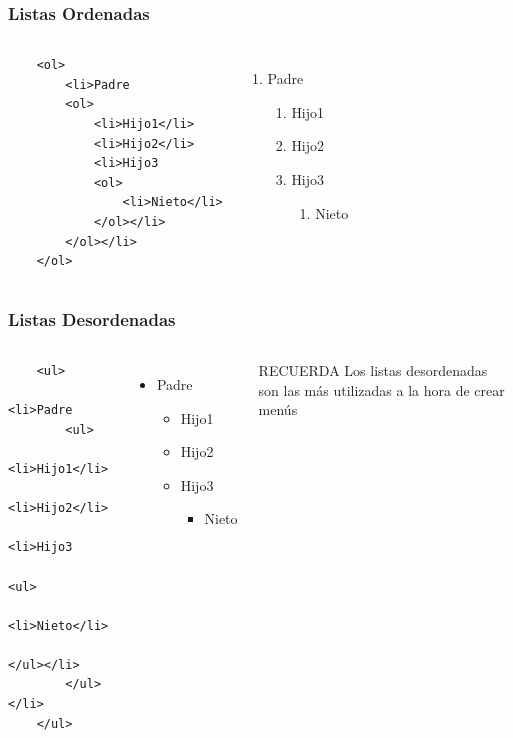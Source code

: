 \documentclass{beamer}
\begin{document}
\begin{frame}[fragile]
\frametitle{Listas Ordenadas}
	\begin{columns}[c]
	\begin{verbatim}
	<ol>
	    <li>Padre
	    <ol>
	        <li>Hijo1</li>
	        <li>Hijo2</li>
	        <li>Hijo3
	        <ol>
	            <li>Nieto</li>
	        </ol></li>
	    </ol></li>
	</ol>
	\end{verbatim}
	\pause
	\begin{enumerate}
	\item Padre
		\begin{enumerate}
		\item Hijo1
		\item Hijo2
		\item Hijo3
			\begin{enumerate}
			\item Nieto
			\end{enumerate}
		\end{enumerate}
	\end{enumerate}
	\end{columns}
\end{frame}

\begin{frame}[fragile]
\frametitle{Listas Desordenadas}
	\begin{columns}[c]
	\begin{verbatim}
	<ul>
	    <li>Padre
	    <ul>
	        <li>Hijo1</li>
	        <li>Hijo2</li>
	        <li>Hijo3
	        <ul>
	            <li>Nieto</li>
	        </ul></li>
	    </ul></li>
	</ul>
	\end{verbatim}
	\pause
	\begin{itemize}
	\item Padre
		\begin{itemize}
		\item Hijo1
		\item Hijo2
		\item Hijo3
			\begin{itemize}
			\item Nieto
			\end{itemize}
		\end{itemize}
	\end{itemize}
	\pause
	\begin{exampleblock}{RECUERDA}
	Los listas desordenadas son las más utilizadas a la hora de crear menús
	\end{exampleblock}
	\end{columns}
\end{frame}
\end{document}
